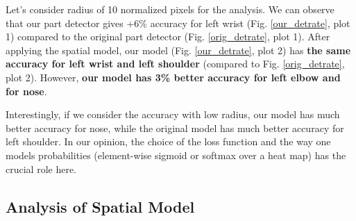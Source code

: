 \documentclass[a4paper,10pt]{article}
\begin{document}
	Let's consider radius of 10 normalized pixels for the analysis. We can observe that our part detector gives +6\% accuracy for left wrist (Fig. \ref{our_detrate}, plot 1) compared to the original part detector (Fig. \ref{orig_detrate}, plot 1). After applying the spatial model, our model (Fig. \ref{our_detrate}, plot 2) has \textbf{the same accuracy for left wrist and left shoulder} (compared to Fig. \ref{orig_detrate}, plot 2). However, \textbf{our model has 3\% better accuracy for left elbow and for nose}. 
	
	Interestingly, if we consider the accuracy with low radius, our model has much better accuracy for nose, while the original model has much better accuracy for left shoulder. In our opinion, the choice of the loss function and the way one models probabilities (element-wise sigmoid or softmax over a heat map) has the crucial role here.
	
	
	\subsection{Analysis of Spatial Model}
	
\end{document}
